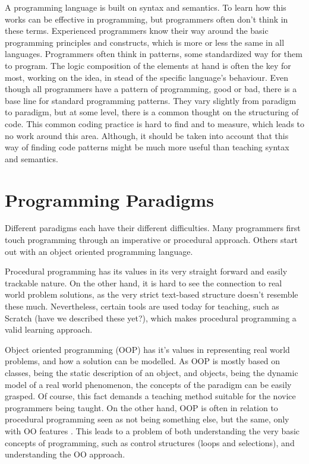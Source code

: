 A programming language is built on syntax and semantics. To learn how this works can be effective in programming, but programmers often don't think in these terms. Experienced programmers know their way around the basic programming principles and constructs, which is more or less the same in all languages. Programmers often think in patterns, some standardized way for them to program. The logic composition of the elements at hand is often the key for most, working on the idea, in stead of the specific language's behaviour. Even though all programmers have a pattern of programming, good or bad, there is a base line for standard programming patterns. They vary slightly from paradigm to paradigm, but at some level, there is a common thought on the structuring of code. This common coding practice is hard to find and to measure, which leads to no  work around this area. Although, it should be taken into account that this way of finding code patterns might be much more useful than teaching syntax and semantics.


\section{Programming Paradigms}
Different paradigms each have their different difficulties. Many programmers first touch programming through an imperative or procedural approach. Others start out with an object oriented programming language. 

Procedural programming has its values in its very straight forward and easily trackable nature. On the other hand, it is hard to see the connection to real world problem solutions, as the very strict text-based structure doesn't resemble these much. Nevertheless, certain tools are used today for teaching, such as Scratch (have we described these yet?), which makes procedural programming a valid learning approach.

Object oriented programming (OOP) has it's values in representing real world problems, and how a solution can be modelled. As OOP is mostly based on classes, being the static description of an object, and objects, being the dynamic model of a real world phenomenon, the concepts of the paradigm can be easily grasped. Of course, this fact demands a teaching method suitable for the novice programmers being taught. On the other hand, OOP is often in relation to procedural programming seen as not being something else, but the same, only with OO features \cite{Garner05}. This leads to a problem of both understanding the very basic concepts of programming, such as control structures (loops and selections), and understanding the OO approach.

